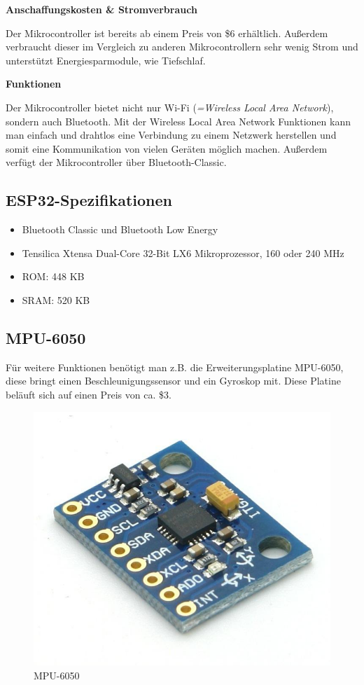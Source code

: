 \textbf{Anschaffungskosten \& Stromverbrauch}

Der Mikrocontroller ist bereits ab einem Preis von \$6 erhältlich. Außerdem verbraucht dieser im Vergleich zu anderen Mikrocontrollern sehr wenig Strom und unterstützt Energiesparmodule, wie Tiefschlaf.

\textbf{Funktionen}

Der Mikrocontroller bietet nicht nur Wi-Fi (\emph{=Wireless Local Area Network}), sondern auch Bluetooth. Mit der Wireless Local Area Network Funktionen kann man einfach und drahtlos eine Verbindung zu einem Netzwerk herstellen und somit eine Kommunikation von vielen Geräten möglich machen. Außerdem verfügt der Mikrocontroller über Bluetooth-Classic.

\subsection{ESP32-Spezifikationen}

\begin{itemize}
	\item Bluetooth Classic und Bluetooth Low Energy
	\item Tensilica Xtensa Dual-Core 32-Bit LX6 Mikroprozessor, 160 oder 240 MHz
	\item ROM:  448 KB
	\item SRAM:  520 KB 
\end{itemize}
\cite{ESP32}

\subsection{MPU-6050}

Für weitere Funktionen benötigt man z.B. die Erweiterungsplatine MPU-6050, diese bringt einen Beschleunigungssensor und ein Gyroskop mit. Diese Platine beläuft sich auf einen Preis von ca. \$3.

\begin{figure}[H]
	\centering
	\includegraphics[width=0.7\linewidth]{images/MPU6050.jpg}
	\caption[MPU6050]{MPU-6050}
	\label{fig:MPU6050}
\end{figure}



